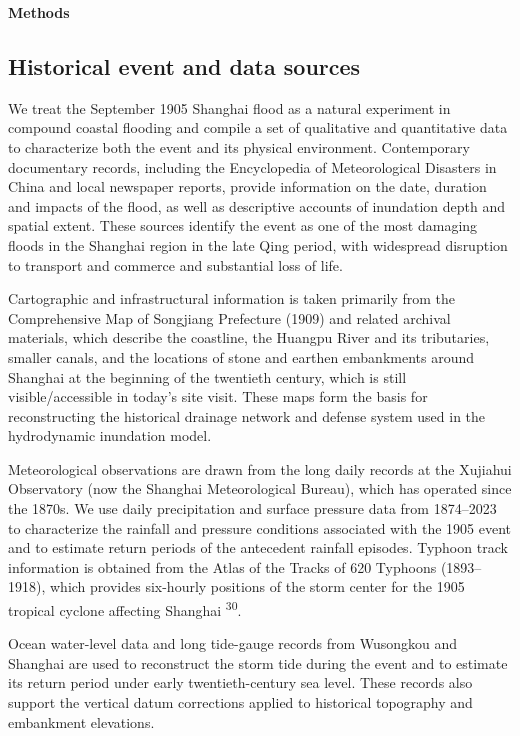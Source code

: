 \documentclass[
]{article}
\begin{document}
\st{\hfill\break
}

\textbf{Methods}

\subsection{\texorpdfstring{\textbf{Historical event and data
sources}}{Historical event and data sources}}\label{historical-event-and-data-sources}

We treat the September 1905 Shanghai flood as a natural experiment in
compound coastal flooding and compile a set of qualitative and
quantitative data to characterize both the event and its physical
environment. Contemporary documentary records, including the
Encyclopedia of Meteorological Disasters in China and local newspaper
reports, provide information on the date, duration and impacts of the
flood, as well as descriptive accounts of inundation depth and spatial
extent. These sources identify the event as one of the most damaging
floods in the Shanghai region in the late Qing period, with widespread
disruption to transport and commerce and substantial loss of life.

Cartographic and infrastructural information is taken primarily from the
Comprehensive Map of Songjiang Prefecture (1909) and related archival
materials, which describe the coastline, the Huangpu River and its
tributaries, smaller canals, and the locations of stone and earthen
embankments around Shanghai at the beginning of the twentieth century,
which is still visible/accessible in today's site visit. These maps form
the basis for reconstructing the historical drainage network and defense
system used in the hydrodynamic inundation model.

Meteorological observations are drawn from the long daily records at the
Xujiahui Observatory (now the Shanghai Meteorological Bureau), which has
operated since the 1870s. We use daily precipitation and surface
pressure data from 1874--2023 to characterize the rainfall and pressure
conditions associated with the 1905 event and to estimate return periods
of the antecedent rainfall episodes. Typhoon track information is
obtained from the Atlas of the Tracks of 620 Typhoons (1893--1918),
which provides six-hourly positions of the storm center for the 1905
tropical cyclone affecting Shanghai \textsuperscript{30}.

Ocean water-level data and long tide-gauge records from Wusongkou and
Shanghai are used to reconstruct the storm tide during the event and to
estimate its return period under early twentieth-century sea level.
These records also support the vertical datum corrections applied to
historical topography and embankment elevations.
\end{document}
